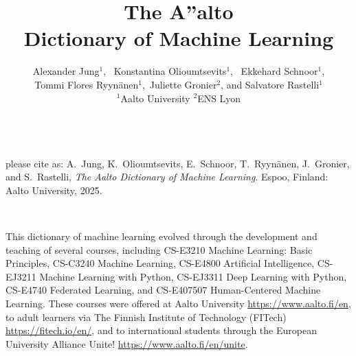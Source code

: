 \documentclass[journal,12pt,onecolumn]{article}
\begin{document}

\title {\vspace*{10mm}
	{\huge {\bf The {\fontsize{40}{48}\selectfont \textbf{\textsf{A\hspace*{-2mm}''}}}\hspace*{-4mm}alto \\ Dictionary of Machine Learning}}  \\[-5mm] 
}


\author{\hspace{-2mm}Alexander Jung${}^{1}$, \ Konstantina Olioumtsevits${}^{1}$, \ 
	Ekkehard Schnoor${}^{1}$, \\[-2mm] Tommi Flores Ryynänen${}^{1}$,\ 
	Juliette Gronier${}^{2}$, and Salvatore Rastelli${}^{1}$ \\[-2mm]
	${}^{1}$Aalto University \quad ${}^{2}$ENS Lyon
}

\maketitle
	\begin{center}
		\\[10mm]
{\large	please cite as: A.\ Jung, K.\ Olioumtsevits, E.\ Schnoor, T.\ Ryynänen, J.\ Gronier, and S.\ Rastelli, \textit{The Aalto Dictionary of Machine Learning}. Espoo, Finland: Aalto University, 2025.}
\end{center}

\newpage 
{}\

\noindent This dictionary of machine learning evolved through the development 
and teaching of several courses, including CS-E3210 Machine Learning: Basic Principles, 
CS-C3240 Machine Learning, CS-E4800 Artificial Intelligence, CS-EJ3211 Machine Learning with Python, 
CS-EJ3311 Deep Learning with Python, CS-E4740 Federated Learning, and 
CS-E407507 Human-Centered Machine Learning. These courses were offered at 
Aalto University \url{https://www.aalto.fi/en}, to adult learners via 
The Finnish Institute of Technology (FITech) \url{https://fitech.io/en/}, and to international 
students through the European University Alliance Unite! \url{https://www.aalto.fi/en/unite}.
\end{document}
